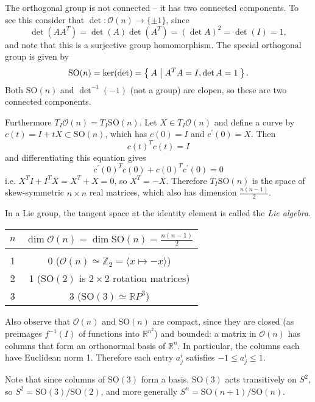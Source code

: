 \begin{xmpl}
\begin{enumerate}
{      The orthogonal group is not connected -- it has two connected
      components. To see this consider that
      $\det: \mathcal{O}(n) \to \{ \pm 1 \}$,
      since
      $$
        \det(A A^T)
      = \det (A) \det (A^T)
      = (\det A)^2
      = \det(I) = 1,
      $$
      and note that this is a surjective group homomorphism.
      The special orthogonal group is given by
      $$
        \mathrm{SO}(n)
      = \ker(\det)
      = \Set{A | A^TA = I, \det A = 1 }.
      $$
      Both
      $\mathrm{SO}(n)$ and $\det^{-1}(-1)$ (not a group) are clopen,
      so these are two connected components.

      Furthermore $T_I \mathcal{O}(n) = T_I \mathrm{SO}(n)$. Let
      $X \in T_I \mathcal{O}(n)$ and define a curve by
      $c(t) = I + tX \subset \mathrm{SO}(n)$, which has $c(0) = I$ and
      $c^\prime(0) = X$. Then
      $$
      c(t)^T c(t) = I
      $$
      and differentiating this equation gives
      $$
        c^\prime(0)^T
        c(0)
      + c(0)^T c^\prime(0)
      = 0
      $$
      i.e. $X^TI + I^T X = X^T + X = 0$, so $X^T = -X$. Therefore
      $T_I\mathrm{SO}(n)$ is the space of skew-symmetric $n \times n$
      real matrices, which also has dimension
      $\frac{n(n-1)}{2}$.
    }
  \end{enumerate}
\end{xmpl}

In a Lie group, the tangent space at the identity element is called
the \emph{Lie algebra}.

\begin{tabular}{c | c}
  $n$ &
  $\dim \mathcal{O}(n) = \dim \mathrm{SO}(n) = \frac{n(n-1)}{2}$ \\
  \hline \\
  1 & 0 ($\mathcal{O}(n) \simeq \mathbb{Z}_2 = \langle x \mapsto -x \rangle$) \\
  2 & 1 ($\mathrm{SO}(2)$ is $2 \times 2$ rotation matrices) \\
  3 & 3 ($\mathrm{SO}(3) \simeq \mathbb{R}P^3$)
\end{tabular}
Also observe that $\mathcal{O}(n)$ and $\mathrm{SO}(n)$ are compact,
since they are closed (as preimages $f^{-1}(I)$ of functions into
$\mathbb{R}^{n^2}$) and bounded: a matrix in
$\mathcal{O}(n)$ has columns that form an orthonormal basis of
$\mathbb{R}^n$. In particular, the columns each have Euclidean norm 1.
Therefore each entry $a^i_j$ satisfies $-1 \leq a^i_j \leq 1$.

Note that since columns of $\mathrm{SO}(3)$ form a basis,
$\mathrm{SO}(3)$ acts transitively on $S^2$, so
$S^2 = \mathrm{SO}(3) / \mathrm{SO}(2)$, and more generally
$S^n = \mathrm{SO}(n+1) / \mathrm{SO}(n)$.

